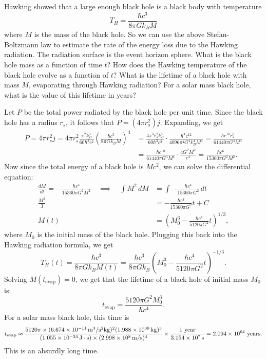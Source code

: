 \documentclass{../../templates/lkx_pset}
\begin{document}
\begin{parts}
	\begin{part}{}
		Hawking showed that a large enough black hole is a black body with temperature
		\[
			T_H = \frac{\hbar c^3}{8\pi G k_B M}
		\]
		where $M$ is the mass of the black hole. So we can use the above Stefan-Boltzmann law to estimate the rate of the energy loss due to the Hawking radiation. The radiation surface is the event horizon sphere. What is the black hole mass as a function of time $t$? How does the Hawking temperature of the black hole evolve as a function of $t$? What is the lifetime of a black hole with mass $M$, evaporating through Hawking radiation? For a solar mass black hole, what is the value of this lifetime in years?
	\end{part}

	Let $P$ be the total power radiated by the black hole per unit time. Since the black hole has a radius $r_s$, it follows that $P=(4\pi r_s^2)j$. Expanding, we get
	\[
		\begin{aligned}
			P = 4\pi r_s^2 j =
			4\pi r_s^2 \frac{\pi^2 k_B^4}{60\hbar^3 c^2}\left(\frac{\hbar c^3}{8\pi G k_B M}\right)^4
			 & = \frac{4\pi^3 r_s^2 k_B^4}{60 \hbar^3 c^2}\cdot \frac{\hbar^4 c^{12}}{4096 \pi^4 G^4 k_B^4 M^4}
			= \frac{\hbar c^{10} r_s^2}{61440 \pi G^4 M^4}                                                      \\
			 & = \frac{\hbar c^{10}}{61440\pi G^4M^4}\cdot \frac{4G^2M^2}{c^4}
			= \frac{\hbar c^6}{15360\pi G^2M^2}.
		\end{aligned}
	\]
	Now since the total energy of a black hole is $Mc^2$, we can solve the differential equation:
	\[
		\begin{aligned}
			\frac{dM}{dt} = -\frac{\hbar c^4}{15360 \pi G^2M^2}\quad\implies\quad
			\int M^2 \,dM & = \int-\frac{\hbar c^4}{15360 \pi G^2}\,dt                     \\
			\frac{M^3}{3} & = -\frac{\hbar c^4}{15360 \pi G^2}t + C                        \\
			M(t)          & = \left(M_0^3 - \frac{\hbar c^4}{5120 \pi G^2} t\right)^{1/3},
		\end{aligned}
	\]
	where $M_0$ is the initial mass of the black hole. Plugging this back into the Hawking radiation formula, we get
	\[
		T_H(t) = \frac{\hbar c^3}{8\pi G k_B M(t)} =
		\frac{\hbar c^3}{8\pi G k_B}\left(M_0^3 - \frac{\hbar c^4}{5120 \pi G^2} t\right)^{-1/3}.
	\]
	Solving $M(t_{\textrm{evap}})=0$, we get that the lifetime of a black hole of initial mass $M_0$ is:
	\[
		t_{\textrm{evap}} = \frac{5120 \pi G^2 M_0^3}{\hbar c^4}.
	\]
	For a solar mass black hole, this time is
	\[
		t_{\textrm{evap}} \approx \frac{5120\pi \times (\Gsi{6.674e-11})^2 (\kgsi{1.988e30})^3}{(\hsi{1.055e-34})\times (\mpssi{2.998e8})^4}\times \frac{1\textrm{ year}}{\ssi{3.154e7}} = 2.094\times 10^{64}\textrm{ years}.
	\]
	This is an absurdly long time.
\end{parts}
\end{document}
